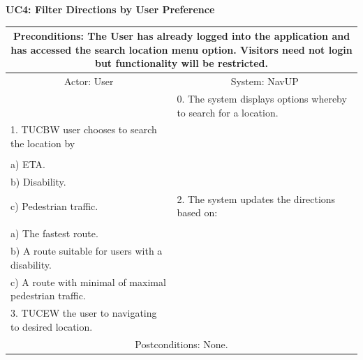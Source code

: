 \documentclass{article}
\begin{document}
        \newpage
				 \vspace{5mm}
                 \begin{flushleft}
                 \textbf{UC4: Filter Directions by User Preference}\\
                  \end{flushleft}
        		\centering	
       		 \small
       		 \begin{tabular}{|p{8cm}|p{8cm}|}
       		 \hline
       		\multicolumn{2}{c}{ Preconditions: The User has already logged into the application and has accessed the search location menu option. Visitors need not login but functionality will be restricted.} \\
       		 \hline
       		 \multicolumn{1}{c}{Actor: User} & \multicolumn{1}{c}{ System: NavUP} \\
        		\hline
       		 & 0.	The system displays options whereby to search for a location.\\
       		 \hline
       		 1.	TUCBW user chooses to search the location by \\

						\\a)	ETA.
						\\b)	Disability.
						\\c)	Pedestrian traffic.
 				& 2.	The system updates the directions based on:\\

						\\a)	The fastest route.
						\\b)	A route suitable for users with a disability.
						\\c)	A route with minimal of maximal pedestrian traffic.
\\
        		\hline
       		 	3.	TUCEW the user to navigating to desired location. &\\
       		 \hline
        		\multicolumn{2}{c}{Postconditions: None.} \\
        		\hline
        \end{tabular} 
     
\end{document}
